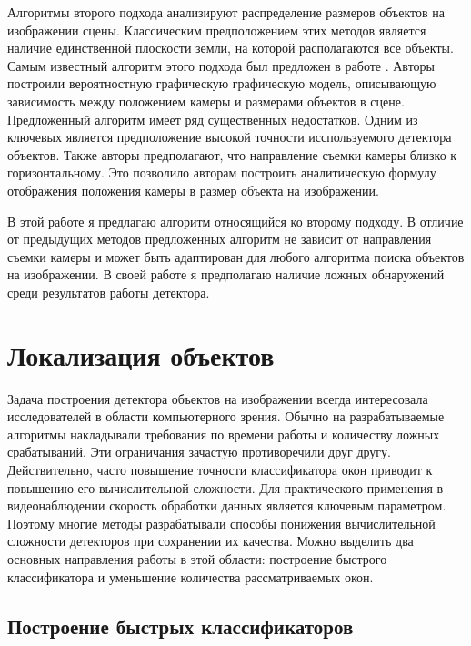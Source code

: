 Алгоритмы второго подхода анализируют распределение размеров объектов на изображении сцены. Классическим предположением этих методов является наличие единственной плоскости земли, на которой располагаются все объекты. Самым известный алгоритм этого подхода был предложен в работе \cite{hoiem2008putting}. Авторы построили вероятностную графическую графическую модель, описывающую зависимость между положением камеры и размерами объектов в сцене. Предложенный алгоритм имеет ряд существенных недостатков. Одним из ключевых является предположение высокой точности исспользуемого детектора объектов. Также авторы предполагают, что направление съемки камеры близко к горизонтальному. Это позволило авторам построить аналитическую формулу отображения положения камеры в размер объекта на изображении.

В этой работе я предлагаю алгоритм относящийся ко второму подходу. В отличие от предыдущих методов предложенных алгоритм не зависит от направления съемки камеры и может быть адаптирован для любого алгоритма поиска объектов на изображении. В своей работе я предполагаю наличие ложных обнаружений среди результатов работы детектора.

\section{Локализация объектов}

Задача построения детектора объектов на изображении всегда интересовала исследователей в области компьютерного зрения. Обычно на разрабатываемые алгоритмы накладывали требования по времени работы и количеству ложных срабатываний. Эти ограничания зачастую противоречили друг другу. Действительно, часто повышение точности классификатора окон приводит к повышению его вычислительной сложности. Для практического применения в видеонаблюдении скорость обработки данных является ключевым параметром. Поэтому многие методы разрабатывали способы понижения вычислительной сложности детекторов при сохранении их качества. Можно выделить два основных направления работы в этой области: построение быстрого классификатора и уменьшение количества рассматриваемых окон.

\subsection{Построение быстрых классификаторов}

